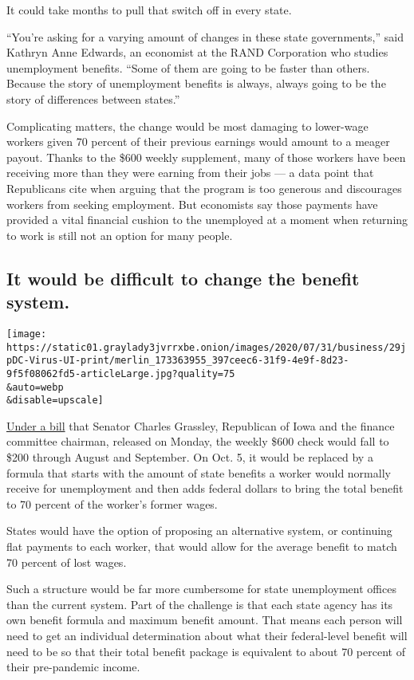 It could take months to pull that switch off in every state.

``You're asking for a varying amount of changes in these state
governments,'' said Kathryn Anne Edwards, an economist at the RAND
Corporation who studies unemployment benefits. ``Some of them are going
to be faster than others. Because the story of unemployment benefits is
always, always going to be the story of differences between states.''

Complicating matters, the change would be most damaging to lower-wage
workers given 70 percent of their previous earnings would amount to a
meager payout. Thanks to the \$600 weekly supplement, many of those
workers have been receiving more than they were earning from their jobs
--- a data point that Republicans cite when arguing that the program is
too generous and discourages workers from seeking employment. But
economists say those payments have provided a vital financial cushion to
the unemployed at a moment when returning to work is still not an option
for many people.

\hypertarget{it-would-be-difficult-to-change-the-benefit-system}{%
\subsection{It would be difficult to change the benefit
system.}\label{it-would-be-difficult-to-change-the-benefit-system}}

\texttt{[image: https://static01.graylady3jvrrxbe.onion/images/2020/07/31/business/29jpDC-Virus-UI-print/merlin\_173363955\_397ceec6-31f9-4e9f-8d23-9f5f08062fd5-articleLarge.jpg?quality=75\\\&auto=webp\\\&disable=upscale]}

\href{https://www.finance.senate.gov/imo/media/doc/SFC\%20CARES\%202.0\%20Legislative\%20Text.pdf}{Under
a bill} that Senator Charles Grassley, Republican of Iowa and the
finance committee chairman, released on Monday, the weekly \$600 check
would fall to \$200 through August and September. On Oct. 5, it would be
replaced by a formula that starts with the amount of state benefits a
worker would normally receive for unemployment and then adds federal
dollars to bring the total benefit to 70 percent of the worker's former
wages.

States would have the option of proposing an alternative system, or
continuing flat payments to each worker, that would allow for the
average benefit to match 70 percent of lost wages.

Such a structure would be far more cumbersome for state unemployment
offices than the current system. Part of the challenge is that each
state agency has its own benefit formula and maximum benefit amount.
That means each person will need to get an individual determination
about what their federal-level benefit will need to be so that their
total benefit package is equivalent to about 70 percent of their
pre-pandemic income.

